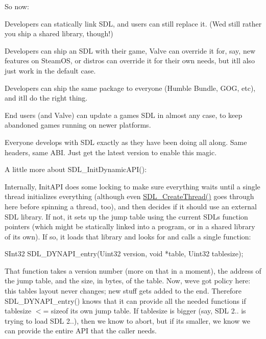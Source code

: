 So now\+:
\begin{DoxyItemize}
\item Developers can statically link S\+DL, and users can still replace it. (We\textquotesingle{}d still rather you ship a shared library, though!)
\item Developers can ship an S\+DL with their game, Valve can override it for, say, new features on Steam\+OS, or distros can override it for their own needs, but it\textquotesingle{}ll also just work in the default case.
\item Developers can ship the same package to everyone (Humble Bundle, G\+OG, etc), and it\textquotesingle{}ll do the right thing.
\item End users (and Valve) can update a game\textquotesingle{}s S\+DL in almost any case, to keep abandoned games running on newer platforms.
\item Everyone develops with S\+DL exactly as they have been doing all along. Same headers, same A\+BI. Just get the latest version to enable this magic.
\end{DoxyItemize}

A little more about S\+D\+L\+\_\+\+Init\+Dynamic\+A\+P\+I()\+:

Internally, Init\+A\+PI does some locking to make sure everything waits until a single thread initializes everything (although even \mbox{\hyperlink{_s_d_l__thread_8h_aca3013d4f50e918b17d2721b37e59082}{S\+D\+L\+\_\+\+Create\+Thread()}} goes through here before spinning a thread, too), and then decides if it should use an external S\+DL library. If not, it sets up the jump table using the current S\+DL\textquotesingle{}s function pointers (which might be statically linked into a program, or in a shared library of its own). If so, it loads that library and looks for and calls a single function\+: \begin{DoxyVerb}SInt32 SDL_DYNAPI_entry(Uint32 version, void *table, Uint32 tablesize);
\end{DoxyVerb}


That function takes a version number (more on that in a moment), the address of the jump table, and the size, in bytes, of the table. Now, we\textquotesingle{}ve got policy here\+: this table\textquotesingle{}s layout never changes; new stuff gets added to the end. Therefore S\+D\+L\+\_\+\+D\+Y\+N\+A\+P\+I\+\_\+entry() knows that it can provide all the needed functions if tablesize $<$= sizeof its own jump table. If tablesize is bigger (say, S\+DL 2.. is trying to load S\+DL 2..), then we know to abort, but if it\textquotesingle{}s smaller, we know we can provide the entire A\+PI that the caller needs.

